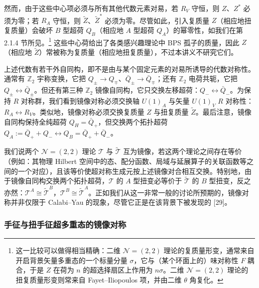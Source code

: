 然而，由于这些中心项必须与所有其他代数元素对易，若 $R_V$ 守恒，则 $Z$、$Z^*$ 必须为零；若 $R_A$ 守恒，则 $\tilde Z$、$\tilde Z^*$ 必须为零。尽管如此，引入复质量 $Z$（相应地扭复质量）会破坏 $B$ 型超荷
$Q_B$（相应地 $A$ 型超荷 $Q_A$）的幂零性，如我们在第 2.1.4 节所见。\footnote{这一比较可以做得相当精确：二维 $\mathcal{N}=(2,2)$ 理论的复质量形变，通常来自开启背景矢量多重态的一个标量分量 $\sigma$，它与（某个环面上的）味对称性 $F$ 耦合，于是 $Z$ 在荷为 $n$ 的超选择扇区上作用为 $n\sigma$。二维 $\mathcal{N}=(2,2)$ 理论的扭复质量形变则常来自 Fayet--Iliopoulos 项，并由二维 $\theta$ 角复化。} 这些中心荷给出了各类感兴趣理论中 BPS 孤子的质量，因此 $Z$（相应地 $\tilde Z$）常被称为复质量（相应地扭复质量），不过本讲义不研究它们。

上述代数有若干外自同构，即不是由与某个固定元素的对易所诱导的代数对称性。通常有 $\mathbb{Z}_2$ 宇称变换，它把 $Q_\pm\to Q_\mp$、$\bar Q_\pm\to\bar Q_\mp$；还有 $\mathbb{Z}_2$ 电荷共轭，它把 $Q_\pm\leftrightarrow\bar Q_\pm$。但还有第三种 $\mathbb{Z}_2$ 镜像自同构，它只交换左移超荷：$Q_-\leftrightarrow\bar Q_-$。为保持 $R$ 对称群，我们看到镜像对称必须交换轴 $U(1)_A$ 与矢量 $U(1)_V$ $R$ 对称性：$R_A\leftrightarrow R_V$。类似地，镜像对称必须交换复质量 $Z$ 与扭复质量 $\tilde Z$。最后注意，镜像自同构保持全纯超荷 $Q_H=\bar Q_+$，但交换两个拓扑超荷 $Q_A := \bar Q_+ + Q_- \leftrightarrow Q_B = \bar Q_+ + \bar Q_-$。

我们说两个 $\mathcal{N}=(2,2)$ 理论 $\mathcal{T}$ 与 $\tilde{\mathcal{T}}$ 互为镜像，若这两个理论之间存在等价（例如：其物理 Hilbert 空间中的态、配分函数、局域与延展算子的关联函数等之间的一个对应），且该等价使超对称生成元按上述镜像对合相互交换。特别地，由于镜像自同构交换两个拓扑超荷，$\mathcal{T}$ 的 $A$ 型扭变必等价于 $\tilde{\mathcal{T}}$ 的 $B$ 型扭变，反之亦然：$\mathcal{T}^A\cong\tilde{\mathcal{T}}^B$，$\mathcal{T}^B\cong\tilde{\mathcal{T}}^A$。正如我们从这一非常一般的讨论所预期的，镜像对称并非仅限于 Calabi--Yau 的现象，尽管它正是在该背景下被发现的 [29]。

\subsubsection{手征与扭手征超多重态的镜像对称}

